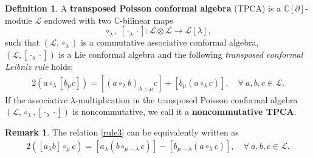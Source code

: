 \documentclass[11pt,letterpaper,reqno]{amsart}
\theoremstyle{definition}
\newtheorem{definition}[theorem]{Definition}
\newtheorem{remark}[theorem]{Remark}
\numberwithin{equation}{section}
\begin{document}
\begin{definition}
   A \textbf{transposed Poisson conformal algebra} (TPCA)  is a $\mathbb{C}[\partial]$-module $\mathcal{L}$ endowed with two $\mathbb{C}$-bilinear maps
   $$\circ_{\lambda},\, [{\cdot_ \lambda \cdot}]: \mathcal{L}  \otimes \mathcal{L}  \rightarrow \mathcal{L} [\lambda],$$ such that $(\mathcal{L} ,\circ_\lambda)$ is a {commutative associative conformal algebra}, $(\mathcal{L} ,[{\cdot_ \lambda \cdot}])$ is a {Lie conformal algebra} and the following \emph{transposed conformal Leibniz rule} holds:
   \begin{align}\label{rule3}
      2 (a\circ_{\lambda}[b_{\mu}c])=[(a\circ_{\lambda}b)_{\lambda+\mu}c]+[b_{\mu}(a\circ_{\lambda}c)],\quad\forall~ a,b,c\in \mathcal{L}.	
   \end{align}%
   If the associative $\lambda$-multiplication in the transposed Poisson conformal algebra $(\mathcal{L},\circ_{\lambda},[{\cdot_ \lambda \cdot}])$ is noncommutative, we call it a \textbf{noncommutative TPCA}.  %
\end{definition}




\begin{remark}
	The relation \eqref{rule3} can be equivalently written as
	\begin{align}\label{rule5}
		2([a_{\lambda}b]\circ_{\mu}c)=[a_{{\lambda}}(b\circ_{\mu-\lambda}c)]-[b_{\mu-\lambda}(a\circ_{\lambda}c)],\quad\forall~ a,b,c\in \mathcal{L}.
	\end{align}
\end{remark}
\end{document}
